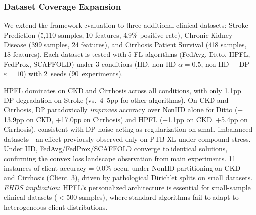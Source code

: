 \documentclass[conference]{IEEEtran}
\begin{document}
\subsubsection{Dataset Coverage Expansion}
\label{sec:dataset_coverage}

We extend the framework evaluation to three additional clinical datasets: Stroke Prediction (5,110 samples, 10 features, 4.9\% positive rate), Chronic Kidney Disease (399 samples, 24 features), and Cirrhosis Patient Survival (418 samples, 18 features). Each dataset is tested with 5 FL algorithms (FedAvg, Ditto, HPFL, FedProx, SCAFFOLD) under 3 conditions (IID, non-IID $\alpha{=}0.5$, non-IID + DP $\varepsilon{=}10$) with 2~seeds (90~experiments).

\begin{table}[htbp]
\centering
\caption{Dataset Coverage Expansion: Mean Accuracy (\%) Across Seeds}
\label{tab:dataset_coverage}

\vspace{1mm}
\footnotesize{HPFL dominates on CKD and Cirrhosis across all conditions, with only 1.1pp DP degradation on Stroke (vs.\ 4--5pp for other algorithms). On CKD and Cirrhosis, DP paradoxically \textit{improves} accuracy over NonIID alone for Ditto ($+$13.9pp on CKD, $+$17.0pp on Cirrhosis) and HPFL ($+$1.1pp on CKD, $+$5.4pp on Cirrhosis), consistent with DP noise acting as regularization on small, imbalanced datasets---an effect previously observed only on PTB-XL under compound stress. Under IID, FedAvg/FedProx/SCAFFOLD converge to identical solutions, confirming the convex loss landscape observation from main experiments. 11 instances of client accuracy = 0.0\% occur under NonIID partitioning on CKD and Cirrhosis (Client~3), driven by pathological Dirichlet splits on small datasets. \textit{EHDS implication}: HPFL's personalized architecture is essential for small-sample clinical datasets ($<$500 samples), where standard algorithms fail to adapt to heterogeneous client distributions.}
\end{table}
\end{document}
